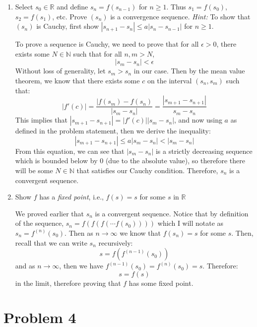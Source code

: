 \documentclass[10pt]{article}
\begin{document}
	\begin{enumerate}[label=\alph*)]
		\item Select $s_0 \in \mathbb R$ and define $s_n = f(s_{n-1})$ for $n \ge 1$. Thus $s_1 = f(s_0)$, 
			$s_2 = f(s_1)$, etc. Prove $(s_n)$ is a convergence sequence. \textit{Hint:} To show that $(s_n)$ is
			Cauchy, first show $|s_{n+1} - s_n| \le a|s_n - s_{n-1}|$ for $n \ge 1$. 

			\begin{solution}
				To prove a sequence is Cauchy, we need to prove that for all $\epsilon > 0$, there exists some
				$N \in \mathbb N$ such that for all $n, m > N$,
				\[
				|s_m - s_n| < \epsilon
				\] 
				Without loss of generality, let $s_m > s_n$ in our case. Then by the mean value theorem, we 
				know that there exists some $c$ on the interval $(s_n, s_m)$ such that:
				\[
					|f'(c)| = \frac{|f(s_m) - f(s_n)}{|s_m - s_n|} = \frac{|s_{m+1} - s_{n+1}|}{s_m - s_n}
				\] 
				This implies that $|s_{m+1} - s_{n+1}| = |f'(c)| |s_m - s_n|$, and now using $a$ as defined 
				in the problem statement, then we derive the inequality:
				\[
					|s_{m+1} - s_{n+1}| \le a|s_m - s_n| < |s_m - s_n|
				\] 
				From this equation, we can see that $|s_m - s_n|$ is a strictly decreasing sequence which is
				bounded below by 0 (due to the absolute value), so therefore there will be some $N \in \mathbb N$
				that satisfies our Cauchy condition. Therefore, $s_n$ is a convergent sequence. 
			\end{solution}
		\item Show $f$ has a \textit{fixed point}, i.e., $f(s) = s$ for some $s$ in $\mathbb R$

			\begin{solution}
				We proved earlier that $s_n$ is a convergent sequence. Notice that by definition of the sequence,
				$s_n = f(f(f(\cdots f(s_0))))$ which I will notate as $s_n = f^{(n)}(s_0)$. Then as $n \to 
				\infty$ we know that $f(s_n) = s$ for some $s$. Then, recall that we can write $s_n$ recursively:
				\[
					s = f(f^{(n-1)}(s_0))
				\] 
				and as $n \to \infty$, then we have $f^{(n-1)}(s_0) = f^{(n)}(s_0) = s$. Therefore:
				\[
				s = f(s)
				\] 
				in the limit, therefore proving that $f$ has some fixed point. 
			\end{solution}
	\end{enumerate}

	\pagebreak

	\section*{Problem 4}
\end{document}

